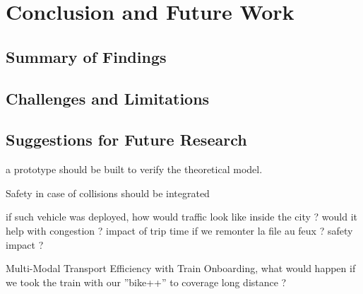 \section{Conclusion and Future Work}

\subsection{Summary of Findings}

\subsection{Challenges and Limitations}

\subsection{Suggestions for Future Research}
a prototype should be built to verify the theoretical model.

Safety in case of collisions should be integrated

if such vehicle was deployed, how would traffic look like inside the city ? would it help with congestion ? 
impact of trip time if we remonter la file au feux ? safety impact ?

Multi-Modal Transport Efficiency with Train Onboarding, what would happen if we took the train with our ”bike++” to coverage long distance ?